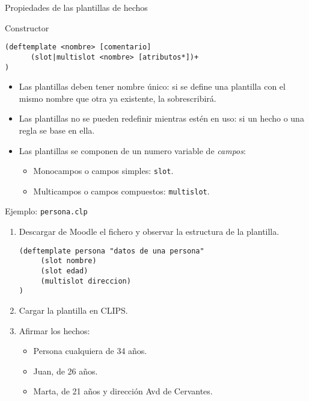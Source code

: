 \documentclass[usenames,dvipsnames,aspectratio=169]{beamer}
\begin{document}
\begin{frame}[fragile]{Propiedades de las plantillas de hechos}
	\begin{block}{Constructor}
		\begin{verbatim}
(deftemplate <nombre> [comentario]
      (slot|multislot <nombre> [atributos*])+
)
		\end{verbatim}
	\end{block}
	\begin{itemize}
		\item Las plantillas deben tener nombre único: si se define una plantilla con el mismo nombre que otra ya existente, la sobrescribirá.
		\item Las plantillas no se pueden redefinir mientras estén en uso: si un hecho o una regla se base en ella.
		\item Las plantillas se componen de un numero variable de \textit{campos}:
		\begin{itemize}
			\item Monocampos o campos simples: \texttt{slot}.
			\item Multicampos o campos compuestos: \texttt{multislot}.
		\end{itemize}
	\end{itemize}
\end{frame}

\begin{frame}[fragile]{Ejemplo: \texttt{persona.clp}}
	\begin{enumerate}
		\item Descargar de Moodle el fichero y observar la estructura de la plantilla.
		\begin{verbatim}
(deftemplate persona "datos de una persona"
     (slot nombre)
     (slot edad)
     (multislot direccion)
)
		\end{verbatim}
		\item Cargar la plantilla en CLIPS.
		\item Afirmar los hechos:
		\begin{itemize}
			\item Persona cualquiera de 34 años.
			\item Juan, de 26 años.
			\item Marta, de 21 años y dirección Avd de Cervantes.
		\end{itemize}
	\end{enumerate}
\end{frame}
\end{document}
